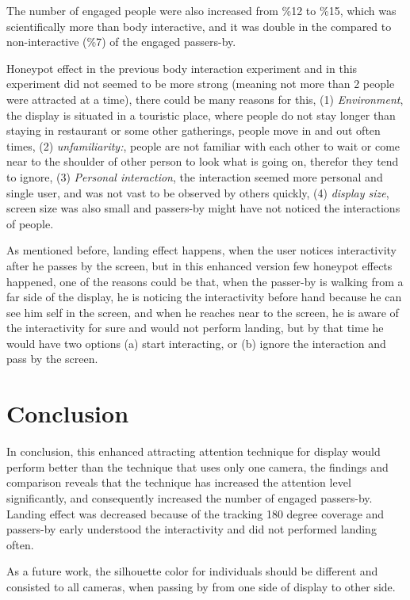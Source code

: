 The number of engaged people were also increased from \%12 to \%15, which was scientifically more than body interactive, and it was double in the compared to non-interactive (\%7) of the engaged passers-by. 



Honeypot effect in the previous body interaction experiment and in this experiment did not seemed to be more strong (meaning not more than 2 people were attracted at a time), there could be many reasons for this, (1) \emph{Environment}, the display is situated in a touristic place, where people do not stay longer than staying in restaurant or some other gatherings, people move in and out often times, (2) \emph{unfamiliarity:}, people are not familiar with each other to wait or come near to the shoulder of other person to look what is going on, therefor they tend to ignore, (3) \emph{Personal interaction}, the interaction seemed more personal and single user,  and was not vast to be observed by others quickly, (4) \emph{display size}, screen size was also small and passers-by might have not noticed the interactions of people.


As mentioned before, landing effect happens, when the user notices interactivity after he passes by the screen, but in this enhanced version few honeypot effects happened, one of the reasons could be that, when the passer-by is walking from a far side of the display, he is noticing the interactivity before hand because he can see him self in the screen, and when he reaches near to the screen, he is aware of the interactivity for sure and would not perform landing, but by that time he would have two options (a) start interacting, or (b) ignore the interaction and pass by the screen.



\section{Conclusion}
In conclusion, this enhanced attracting attention technique for display would perform better than the technique that uses only one camera, the findings and comparison reveals that the technique has increased the attention level significantly, and consequently increased the number of engaged passers-by. Landing effect was decreased because of the tracking 180 degree coverage and passers-by early understood the interactivity and did not performed landing often. 

As a future work, the silhouette color for individuals should be different and consisted to all cameras, when passing by from one side of display to other side. 


